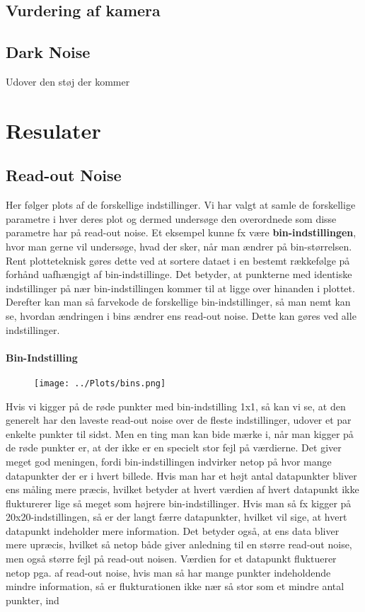 \documentclass[working]{tuftebook}
\begin{document}
\section{Vurdering af kamera}
\section{Dark Noise}
Udover den støj der kommer 
\chapter{Resulater}
\section{Read-out Noise}
Her følger plots af de forskellige indstillinger. Vi har valgt at samle de forskellige parametre i hver deres plot og dermed undersøge den overordnede som disse parametre har på read-out noise.
Et eksempel kunne fx være \textbf{bin-indstillingen}, hvor man gerne vil undersøge, hvad der sker, når man ændrer på bin-størrelsen. Rent plotteteknisk gøres dette ved at sortere dataet i en bestemt rækkefølge på forhånd uafhængigt af bin-indstillinge. Det betyder, at punkterne med identiske indstillinger på nær bin-indstillingen kommer til at ligge over hinanden i plottet. Derefter kan man så farvekode de forskellige bin-indstillinger, så man nemt kan se, hvordan ændringen i bins ændrer ens read-out noise. Dette kan gøres ved alle indstillinger.
\subsubsection*{Bin-Indstilling}
\begin{figure}[ht]
\centering
{}
\texttt{[image: ../Plots/bins.png]}	
\end{figure}
Hvis vi kigger på de røde punkter med bin-indstilling 1x1, så kan vi se, at den generelt har den laveste read-out noise over de fleste indstillinger, udover et par enkelte punkter til sidst. Men en ting man kan bide mærke i, når man kigger på de røde punkter er, at der ikke er en specielt stor fejl på værdierne. Det giver meget god meningen, fordi bin-indstillingen indvirker netop på hvor mange datapunkter der er i hvert billede. Hvis man har et højt antal datapunkter bliver ens måling mere præcis, hvilket betyder at hvert værdien af hvert datapunkt ikke flukturerer lige så meget som højrere bin-indstillinger. Hvis man så fx kigger på 20x20-indstillingen, så er der langt færre datapunkter, hvilket vil sige, at hvert datapunkt indeholder mere information. Det betyder også, at ens data bliver mere upræcis, hvilket så netop både giver anledning til en større read-out noise, men også større fejl på read-out noisen. Værdien for et datapunkt fluktuerer netop pga. af read-out noise, hvis man så har mange punkter indeholdende mindre information, så er flukturationen ikke nær så stor som et mindre antal punkter, ind
\end{document}
